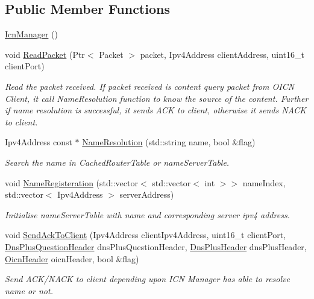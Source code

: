 \subsection*{Public Member Functions}
\begin{DoxyCompactItemize}
\item 
\hyperlink{classns3_1_1IcnManager_a1f48e87348770a7857f1dbbf4279b169}{Icn\-Manager} ()
\item 
void \hyperlink{classns3_1_1IcnManager_af448a19c4cbb801cc0e794a680c95e7a}{Read\-Packet} (Ptr$<$ Packet $>$ packet, Ipv4\-Address client\-Address, uint16\-\_\-t client\-Port)
\begin{DoxyCompactList}\small\item\em Read the packet received. If packet received is content query packet from O\-I\-C\-N Client, it call Name\-Resolution function to know the source of the content. Further if name resolution is successful, it sends A\-C\-K to client, otherwise it sends N\-A\-C\-K to client. \end{DoxyCompactList}\item 
Ipv4\-Address const $\ast$ \hyperlink{classns3_1_1IcnManager_a305b143330eaf36bba91e86eba4619fd}{Name\-Resolution} (std\-::string name, bool \&flag)
\begin{DoxyCompactList}\small\item\em Search the name in Cached\-Router\-Table or name\-Server\-Table. \end{DoxyCompactList}\item 
void \hyperlink{classns3_1_1IcnManager_acc48cc930981a8e45d440559139b9c1f}{Name\-Registeration} (std\-::vector$<$ std\-::vector$<$ int $>$$>$ name\-Index, std\-::vector$<$ Ipv4\-Address $>$ server\-Address)
\begin{DoxyCompactList}\small\item\em Initialise name\-Server\-Table with name and corresponding server ipv4 address. \end{DoxyCompactList}\item 
void \hyperlink{classns3_1_1IcnManager_a7152eb46e71b0e33cbb6ccd23cbe6266}{Send\-Ack\-To\-Client} (Ipv4\-Address client\-Ipv4\-Address, uint16\-\_\-t client\-Port, \hyperlink{classns3_1_1DnsPlusQuestionHeader}{Dns\-Plus\-Question\-Header} dns\-Plus\-Question\-Header, \hyperlink{classns3_1_1DnsPlusHeader}{Dns\-Plus\-Header} dns\-Plus\-Header, \hyperlink{classns3_1_1OicnHeader}{Oicn\-Header} oicn\-Header, bool \&flag)
\begin{DoxyCompactList}\small\item\em Send A\-C\-K/\-N\-A\-C\-K to client depending upon I\-C\-N Manager has able to resolve name or not. \end{DoxyCompactList}\item 
$$
\end{DoxyCompactItemize}
